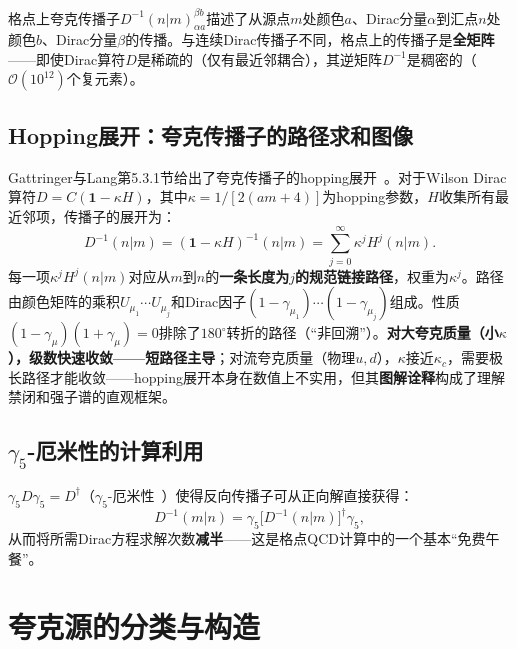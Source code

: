 \documentclass[12pt,a4paper]{ctexart}
\theoremstyle{definition}
\begin{document}
格点上夸克传播子$D^{-1}(n|m)^{\beta b}_{\alpha a}$描述了从源点$m$处颜色$a$、Dirac分量$\alpha$到汇点$n$处颜色$b$、Dirac分量$\beta$的传播。与连续Dirac传播子不同，格点上的传播子是\textbf{全矩阵}——即使Dirac算符$D$是稀疏的（仅有最近邻耦合），其逆矩阵$D^{-1}$是稠密的（$\mathcal{O}(10^{12})$个复元素）。

\subsection{Hopping展开：夸克传播子的路径求和图像}

Gattringer与Lang第5.3.1节给出了夸克传播子的hopping展开~\cite{GattringerLang2010}。对于Wilson Dirac算符$D = C(\mathbf{1} - \kappa H)$，其中$\kappa = 1/[2(am+4)]$为hopping参数，$H$收集所有最近邻项，传播子的展开为：
\begin{equation}
\boxed{D^{-1}(n|m) = (\mathbf{1} - \kappa H)^{-1}(n|m) = \sum_{j=0}^\infty \kappa^j H^j(n|m)}.
\label{eq:hopping_expansion_prop}
\end{equation}
每一项$\kappa^j H^j(n|m)$对应从$m$到$n$的\textbf{一条长度为$j$的规范链接路径}，权重为$\kappa^j$。路径由颜色矩阵的乘积$U_{\mu_1}\cdots U_{\mu_j}$和Dirac因子$(1-\gamma_{\mu_1})\cdots(1-\gamma_{\mu_j})$组成。性质$(1-\gamma_\mu)(1+\gamma_\mu) = 0$排除了$180^\circ$转折的路径（``非回溯''）。\textbf{对大夸克质量（小$\kappa$），级数快速收敛——短路径主导}；对流夸克质量（物理$u,d$），$\kappa$接近$\kappa_c$，需要极长路径才能收敛——hopping展开本身在数值上不实用，但其\textbf{图解诠释}构成了理解禁闭和强子谱的直观框架。

\subsection{$\gamma_5$-厄米性的计算利用}

$\gamma_5 D \gamma_5 = D^\dagger$（$\gamma_5$-厄米性~\cite{GattringerLang2010}）使得反向传播子可从正向解直接获得：
\begin{equation}
D^{-1}(m|n) = \gamma_5 \big[D^{-1}(n|m)\big]^\dagger \gamma_5,
\label{eq:gamma5_hermiticity}
\end{equation}
从而将所需Dirac方程求解次数\textbf{减半}——这是格点QCD计算中的一个基本``免费午餐''。

\section{夸克源的分类与构造}
\end{document}
